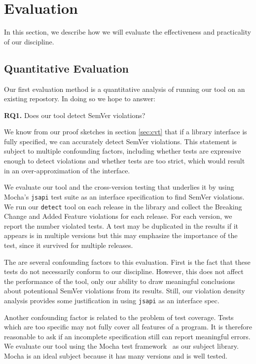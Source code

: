 \section{Evaluation}
In this section, we describe how we will evaluate the effectiveness
and practicality of our discipline.

\subsection{Quantitative Evaluation}
Our first evaluation method is a quantitative analysis of running our
tool on an existing repostory. In doing so we hope to answer:

{\bf RQ1.} Does our tool detect SemVer violations?

We know from our proof sketches in section \ref{sec:cvt} that if a
library interface is fully specified, we can accurately detect SemVer
violations. This statement is subject to multiple confounding
factors, including whether tests are expressive enough to detect
violations and whether tests are too strict, which would result in an
over-approximation of the interface.

We evaluate our tool and the cross-version testing that underlies it
by using Mocha's {\tt jsapi} test suite as an interface specification
to find SemVer violations.
%
We run our {\tt detect} tool on each release in the library and
collect the Breaking Change and Added Feature violations for each
release. For each version, we report the number violated tests. A test
may be duplicated in the results if it appears is in multiple versions
but this may emphasize the importance of the test, since it survived
for multiple releases.

The are several confounding factors to this evaluation. First is the
fact that these tests do not necessarily conform to our
discipline. However, this does not affect the performance of the tool,
only our ability to draw meaningful conclusions about potentional
SemVer violations from its results. Still, our violation density
analysis provides some justification in using {\tt jsapi} as an
interface spec.

Another confounding factor is related to the problem of test
coverage. Tests which are too specific may not fully cover all
features of a program. It is therefore reasonable to ask if an
incomplete specification still can report meaningful errors.  We
evaluate our tool using the Mocha test framework~\cite{mocha} as our
subject library. Mocha is an ideal subject because it has many
versions and is well tested.

